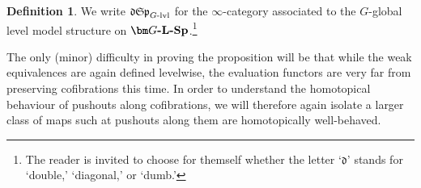 \documentclass[reqno]{memo-l}
\theoremstyle{mythm}
\theoremstyle{definition}
\newtheorem{definition}[thm]{Definition}
\numberwithin{equation}{section}
\newcommand{\cat}[1]{\textbf{\textup{#1}}}
\newcommand{\mySp}{{\mathfrak S\kern-.5pt\mathfrak p}}
\newcommand{\myLSp}{{\mathfrak d\kern-.25pt}\mySp}
\begin{document}
\begin{definition}
    We write $\myLSp_\textup{$G$-lvl}$ for the $\infty$-category associated to the $G$-global level model structure on $\cat{$\bm G$-$\cat{L}$-Sp}$.\footnote{The reader is invited to choose for themself whether the letter `$\mathfrak d$' stands for `double,' `diagonal,' or `dumb.'}
\end{definition}

The only (minor) difficulty in proving the proposition will be that while the weak equivalences are again defined levelwise, the evaluation functors are very far from preserving cofibrations this time. In order to understand the homotopical behaviour of pushouts along cofibrations, we will therefore again isolate a larger class of maps such at pushouts along them are homotopically well-behaved.
\end{document}
